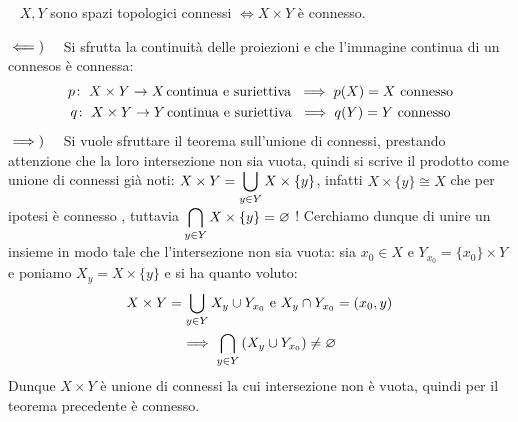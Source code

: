 \begin{theorema}~{}\label{prodotto connessi}
	$X, Y$ sono spazi topologici connessi $\iff X\times Y$ è connesso.	
\end{theorema}
\begin{demonstration}
	$\impliedby)\quad$ Si sfrutta la continuità delle proiezioni e che l'immagine continua di un connesos è connessa:
		\begin{gather*}
			\funz p {X\times Y} X \text{continua e suriettiva } \implies p(X)=X \text{ connesso} \\
			\funz q {X\times Y} Y \text{continua e suriettiva } \implies q(Y)=Y \text{ connesso}	
		\end{gather*}	
	$\implies)\quad$ Si vuole sfruttare il teorema sull'unione di connessi, prestando attenzione che la loro intersezione non sia vuota, quindi si scrive il prodotto come unione di connessi già noti:
	$\displaystyle X\times Y=\mathop{{\bigcup}}\displaylimits_{y\in Y}X\times\{y\}$, infatti $X\times\{y\}\cong X$ che per ipotesi è connesso , tuttavia $\displaystyle\mathop{{\bigcap}}\displaylimits_{y\in Y}X\times\{y\}=\varnothing$ !\newline
	Cerchiamo dunque di unire un insieme in modo tale che l'intersezione non sia vuota: sia $x_0\in X$ e $Y_{x_0}=\{x_0\}\times Y$ e poniamo $X_y=X\times\{y\}$ e si ha quanto voluto:
		\begin{gather*}
			X\times Y=\mathop{{\bigcup}}\displaylimits_{y\in Y}X_y \cup Y_{x_0} \text{ e } X_y\cap Y_{x_0}=(x_0,y)\\
			\implies \mathop{{\bigcap}}\displaylimits_{y\in Y}\left( X_y  \cup Y_{x_0}\right)\neq\varnothing		
		\end{gather*}
	Dunque $X\times Y$ è unione di connessi la cui intersezione non è vuota, quindi per il teorema precedente è connesso.
\end{demonstration}

